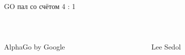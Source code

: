 \documentclass[notes,12pt, aspectratio=169]{beamer}
\begin{document}
\begin{frame}{GO пал со счётом 4 : 1}
\begin{columns}[T]
	\begin{column}{.49\textwidth}
		\hspace{1.5cm}
		\mbox{ }
		
		\hspace{1.6cm} AlphaGo by Google
	\end{column}
	\hfill
	\begin{column}{.49\textwidth}
		\hspace{1.5cm}
		\mbox{ }
		
		\hspace{2.5cm} Lee Sedol
	\end{column}
\end{columns}
\end{frame}
\end{document}
